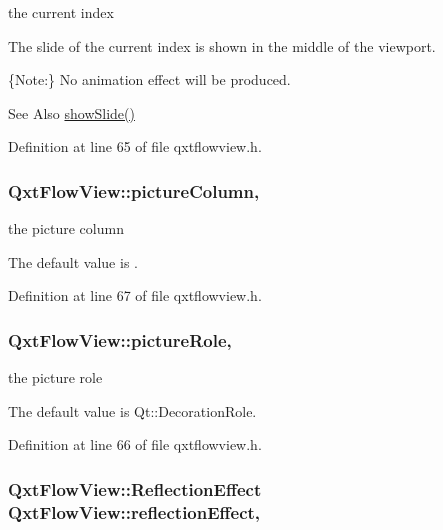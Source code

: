 the current index 

The slide of the current index is shown in the middle of the viewport.

\{Note\-:\} No animation effect will be produced. \begin{DoxySeeAlso}{See Also}
\hyperlink{class_qxt_flow_view_a163bb085e48837aabb5801dc027ef968}{show\-Slide()} 
\end{DoxySeeAlso}


Definition at line 65 of file qxtflowview.\-h.

\hypertarget{class_qxt_flow_view_af79a05af3cef867521971377ccd0c448}{
\subsubsection[{picture\-Column}]{ Qxt\-Flow\-View\-::picture\-Column\hspace{0.3cm}{\ttfamily [read]}, {\ttfamily [write]}}}\label{class_qxt_flow_view_af79a05af3cef867521971377ccd0c448}


the picture column 

The default value is {}. 

Definition at line 67 of file qxtflowview.\-h.

\hypertarget{class_qxt_flow_view_a5ccde7223fc2d457f05e12b78d2a3ac2}{
\subsubsection[{picture\-Role}]{ Qxt\-Flow\-View\-::picture\-Role\hspace{0.3cm}{\ttfamily [read]}, {\ttfamily [write]}}}\label{class_qxt_flow_view_a5ccde7223fc2d457f05e12b78d2a3ac2}


the picture role 

The default value is Qt\-::\-Decoration\-Role. 

Definition at line 66 of file qxtflowview.\-h.

\hypertarget{class_qxt_flow_view_aa9f6458055ffd4ed7e3b341bf9789d25}{
\subsubsection[{reflection\-Effect}]{\setlength{\rightskip}{0pt plus 5cm}Qxt\-Flow\-View\-::\-Reflection\-Effect Qxt\-Flow\-View\-::reflection\-Effect\hspace{0.3cm}{\ttfamily [read]}, {\ttfamily [write]}}}\label{class_qxt_flow_view_aa9f6458055ffd4ed7e3b341bf9789d25}


